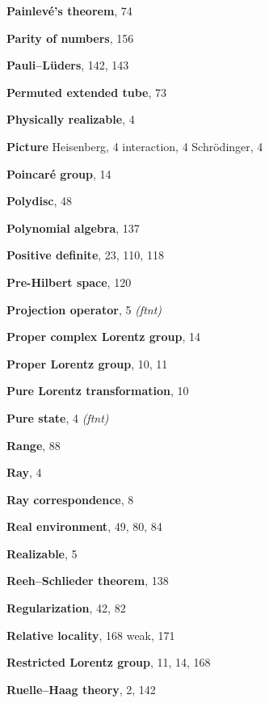 \begin{theindex}
\indexspace
\item \textbf{Painlev\'e's theorem}, 74
\item \textbf{Parity of numbers}, 156
\item \textbf{Pauli--Lüders}, 142, 143
\item \textbf{Permuted extended tube}, 73

\item \textbf{Physically realizable}, 4
\item \textbf{Picture}
\subitem Heisenberg, 4
\subitem interaction, 4
\subitem Schr\"odinger, 4
\item \textbf{Poincaré group}, 14
\item \textbf{Polydisc}, 48
\item \textbf{Polynomial algebra}, 137
\item \textbf{Positive definite}, 23, 110, 118
\item \textbf{Pre-Hilbert space}, 120
\item \textbf{Projection operator}, 5 \textit{(ftnt)}
\item \textbf{Proper complex Lorentz group}, 14
\item \textbf{Proper Lorentz group}, 10, 11
\item \textbf{Pure Lorentz transformation}, 10
\item \textbf{Pure state}, 4 \textit{(ftnt)}

\indexspace
\item \textbf{Range}, 88
\item \textbf{Ray}, 4
\item \textbf{Ray correspondence}, 8
\item \textbf{Real environment}, 49, 80, 84
\item \textbf{Realizable}, 5
\item \textbf{Reeh--Schlieder theorem}, 138
\item \textbf{Regularization}, 42, 82
\item \textbf{Relative locality}, 168
\subitem weak, 171
\item \textbf{Restricted Lorentz group}, 11, 14, 168
\item \textbf{Ruelle--Haag theory}, 2, 142


\end{theindex}
